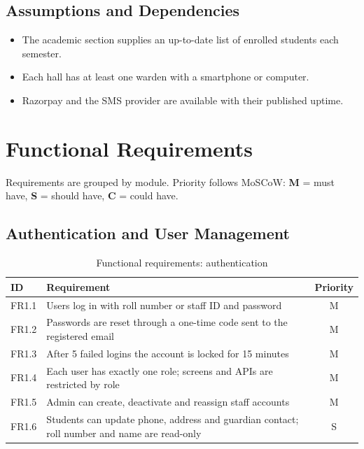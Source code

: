 \documentclass[11pt,a4paper]{report}
\begin{document}
\subsection{Assumptions and Dependencies}
\begin{itemize}
  \item The academic section supplies an up-to-date list of enrolled students each semester.
  \item Each hall has at least one warden with a smartphone or computer.
  \item Razorpay and the SMS provider are available with their published uptime.
\end{itemize}

\section{Functional Requirements}
Requirements are grouped by module. Priority follows MoSCoW: \textbf{M} = must have, \textbf{S} = should have, \textbf{C} = could have.

\subsection{Authentication and User Management}
\begin{table}[H]
\centering\small
\caption{Functional requirements: authentication}\label{tab:fr-auth}
\begin{tabularx}{\textwidth}{lLc}
\toprule
\textbf{ID} & \textbf{Requirement} & \textbf{Priority}\\
\midrule
FR1.1 & Users log in with roll number or staff ID and password & M\\
FR1.2 & Passwords are reset through a one-time code sent to the registered email & M\\
FR1.3 & After 5 failed logins the account is locked for 15 minutes & M\\
FR1.4 & Each user has exactly one role; screens and APIs are restricted by role & M\\
FR1.5 & Admin can create, deactivate and reassign staff accounts & M\\
FR1.6 & Students can update phone, address and guardian contact; roll number and name are read-only & S\\
\bottomrule
\end{tabularx}
\end{table}
\end{document}
